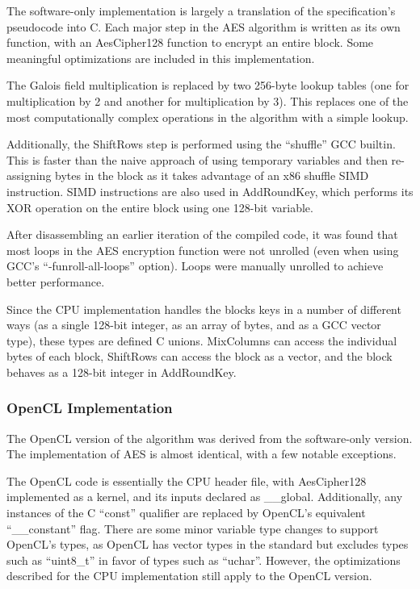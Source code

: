 \documentclass[a4paper,10pt]{article}
\begin{document}
The software-only implementation is largely a translation of the specification's pseudocode into C.  Each major step in the AES algorithm is written as its own function, with an AesCipher128 function to encrypt an entire block.  Some meaningful optimizations are included in this implementation.

The Galois field multiplication is replaced by two 256-byte lookup tables (one for multiplication by 2 and another for multiplication by 3). This replaces one of the most computationally complex operations in the algorithm with a simple lookup.

Additionally, the ShiftRows step is performed using the ``shuffle'' GCC builtin.  This is faster than the naive approach of using temporary variables and then re-assigning bytes in the block as it takes advantage of an x86 shuffle SIMD instruction.  SIMD instructions are also used in AddRoundKey, which performs its XOR operation on the entire block using one 128-bit variable.

After disassembling an earlier iteration of the compiled code, it was found that most loops in the AES encryption function were not unrolled (even when using GCC's ``-funroll-all-loops'' option).  Loops were manually unrolled to achieve better performance.

Since the CPU implementation handles the blocks keys in a number of different ways (as a single 128-bit integer, as an array of bytes, and as a GCC vector type), these types are defined C unions. MixColumns can access the individual bytes of each block, ShiftRows can access the block as a vector, and the block behaves as a 128-bit integer in AddRoundKey.

\subsubsection{OpenCL Implementation}

The OpenCL version of the algorithm was derived from the software-only version.  The implementation of AES is almost identical, with a few notable exceptions.

The OpenCL code is essentially the CPU header file, with AesCipher128 implemented as a kernel, and its inputs declared as \_\_global.  Additionally, any instances of the C ``const'' qualifier are replaced by OpenCL's equivalent ``\_\_constant'' flag.  There are some minor variable type changes to support OpenCL's types, as OpenCL has vector types in the standard but excludes types such as ``uint8\_t'' in favor of types such as ``uchar''.  However, the optimizations described for the CPU implementation still apply to the OpenCL version.
\end{document}

